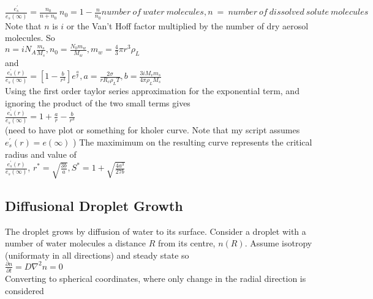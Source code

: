 \documentclass[11pt]{article} %
\begin{document}
$\frac{e^{'}_{s}}{e_{s}(\infty)} = \frac{n_{0}}{n + n_{0}}\ n_{0} = 1 - \frac{n}{n_{0}} number \ of \ water \ molecules, n \ = \ number \ of \ dissolved \ solute \ molecules$\\

 Note that $n$  is $i$ or the Van't Hoff factor multiplied by the number of dry aerosol molecules. So \\

$n = iN_{A}\frac{m_{s}}{M_{s}}, n_{0} = \frac{N_{0}m_{w}}{M_{w}}, m_{w} = \frac{4}{3} \pi r^{3} \rho_{L}$ \\

and \\

$\frac{e^{'}_{s}(r)}{e_{s}(\infty)} = [1 - \frac{b}{r^{3}}]e^{\frac{a}{r}}, a = \frac{2 \sigma}{r R_{v} \rho_{L}T}, b = \frac{3iM_{v} m_{s}}{4 \pi \rho_{L} M_{s}}$ \\

 Using the first order taylor series approximation for the exponential term, and ignoring the product of the two small terms gives \\

$\frac{e^{'}_{s}(r)}{e_{s}(\infty)} = 1 + \frac{a}{r} - \frac{b}{r^{3}}$ \\

 (need to have plot or something for kholer curve.  Note that my script assumes $e^{'}_{s}(r) = e(\infty)$  ) The maximimum on the resulting curve represents the critical radius and value  of \\

$\frac{e^{'}_{s}(r)}{e_{s}(\infty)}$, $r^{*} = \sqrt{\frac{3b}{a}}, S^{*} = 1 + \sqrt{\frac{4a^{3}}{27b}}$\\

\subsection{Diffusional Droplet Growth}

The droplet grows by diffusion of water to its surface.  Consider a droplet with a number of water molecules a distance $R$ from its centre, $n(R)$.  Assume isotropy (uniformaty in all directions) and steady state so \\

$\frac{\partial n}{\partial t} = D \nabla^{2} n = 0$  \\

Converting to spherical coordinates, where only change in the radial direction is considered \\
\end{document}
